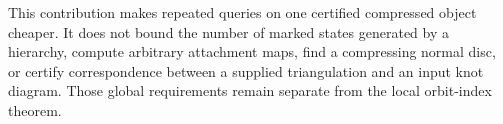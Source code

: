 This contribution makes repeated queries on one certified compressed object
cheaper.  It does not bound the number of marked states generated by a
hierarchy, compute arbitrary attachment maps, find a compressing normal
disc, or certify correspondence between a supplied triangulation and an
input knot diagram.  Those global requirements remain separate from the
local orbit-index theorem.
